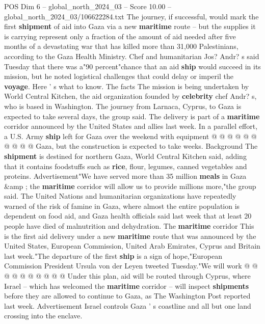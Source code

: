 \begin{textsample}{POS Dim 6 – global\_north\_2024\_03 – Score 10.00 – global\_north\_2024\_03/106622284.txt}  \label{ex:f6_pos_055}
The journey, if successful, would mark the first \textbf{shipment} of aid into Gaza via a new \textbf{maritime} route -- but the supplies it is carrying represent only a fraction of the amount of aid needed after five months of a devastating war that has killed more than 31,000 Palestinians, according to the Gaza Health Ministry.
Chef and humanitarian Jos?
Andr? s said Tuesday that there was a"90 percent"chance that an aid \textbf{ship} would succeed in its mission, but he noted logistical challenges that could delay or imperil the \textbf{voyage}.
Here ' s what to know.
The facts The mission is being undertaken by World Central Kitchen, the aid organization founded by \textbf{celebrity} chef Andr? s, who is based in Washington.
The journey from Larnaca, Cyprus, to Gaza is expected to take several days, the group said.
The delivery is part of a \textbf{maritime} corridor announced by the United States and allies last week.
In a parallel effort, a U.S.
Army \textbf{ship} left for Gaza over the weekend with equipment @ @ @ @ @ @ @ @ @ @ Gaza, but the construction is expected to take weeks.
Background The \textbf{shipment} is destined for northern Gaza, World Central Kitchen said, adding that it contains foodstuffs such as \textbf{rice}, flour, legumes, canned vegetables and proteins.
Advertisement"We have served more than 35 million \textbf{meals} in Gaza \&amp ; the \textbf{maritime} corridor will allow us to provide millions more,"the group said.
The United Nations and humanitarian organizations have repeatedly warned of the risk of famine in Gaza, where almost the entire population is dependent on food aid, and Gaza health officials said last week that at least 20 people have died of malnutrition and dehydration.
The \textbf{maritime} corridor This is the first aid delivery under a new \textbf{maritime} route that was announced by the United States, European Commission, United Arab Emirates, Cyprus and Britain last week."The departure of the first \textbf{ship} is a sign of hope,"European Commission President Ursula von der Leyen tweeted Tuesday."We will work @ @ @ @ @ @ @ @ @ @ Under this plan, aid will be routed through Cyprus, where Israel -- which has welcomed the \textbf{maritime} corridor -- will inspect \textbf{shipments} before they are allowed to continue to Gaza, as The Washington Post reported last week.
Advertisement Israel controls Gaza ' s coastline and all but one land crossing into the enclave.

\end{textsample}
